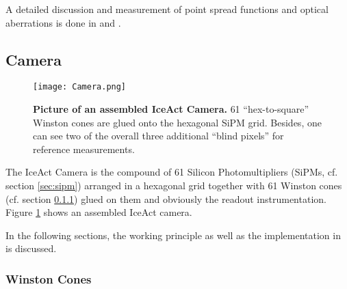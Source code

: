 A detailed discussion and measurement of point spread functions and optical aberrations is done in \cite{famous:niggemann} and \cite{famous:eichler}.

\subsection{Camera}\label{iceact:model:camera}

\begin{figure}
	\centering
	\texttt{[image: Camera.png]}
	\caption[Picture of an assembled IceAct Camera]{\textbf{Picture of an assembled IceAct Camera.} \cite{iceact:camera:burgmann} 61 \enquote{hex-to-square} Winston cones are glued onto the hexagonal SiPM grid. Besides, one can see two of the overall three additional \enquote{blind pixels} for reference measurements.}
	\label{iceact:camera:picture}	
\end{figure}

The IceAct Camera is the compound of 61 Silicon Photomultipliers (SiPMs, cf. section \ref{sec:sipm}) arranged in a hexagonal grid together with 61 Winston cones (cf. section \ref{sec:winstoncones}) glued on them and obviously the readout instrumentation. Figure \ref{iceact:camera:picture} shows an assembled IceAct camera.


In the following sections, the working principle as well as the implementation in \geant is discussed.

\subsubsection{Winston Cones}\label{sec:winstoncones}


